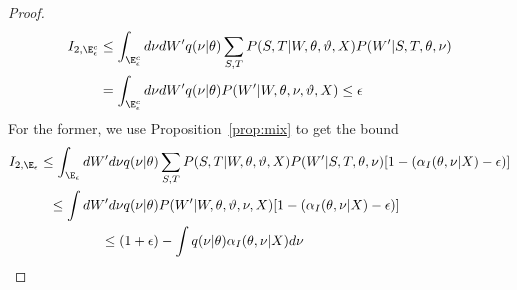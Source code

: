 \begin{proof}
\begin{align*}
  I_{2,\E_{\epsilon}^c} &\le \int_{\E^c_{\epsilon}} d\nu dW'
q(\nu | \theta) \sum_{S,T} P(S, T |  W, \theta, \vartheta,
X)P(W' | S, T, \theta, \nu) \\ 
& = \int_{\E^c_{\epsilon}} d\nu dW'
q(\nu | \theta) P(W' |  W, \theta, \nu, \vartheta, X) 
\le \epsilon 
\end{align*}
{For the former, we use Proposition~\ref{prop:mix} to get the bound}
\begin{align*}
I_{2,\E_{\epsilon}} \le \int_{\E_\epsilon}dW' d\nu q(\nu | \theta) &
  \sum_{S,T} P(S, T | W, \theta, \vartheta, X)P(W' | S, T, \theta, \nu) 
  [ 1 - (\alpha_I(\theta, \nu | X)-\epsilon)] \\
\le \int dW' d\nu q(\nu | \theta) &
  P(W' | W, \theta, \vartheta, \nu, X) 
  [ 1 - (\alpha_I(\theta, \nu | X)-\epsilon)] \\
  \le (1+\epsilon) & - \int  q(\nu | \theta) \alpha_I(\theta, \nu | X) d\nu
\end{align*}


\end{proof}
